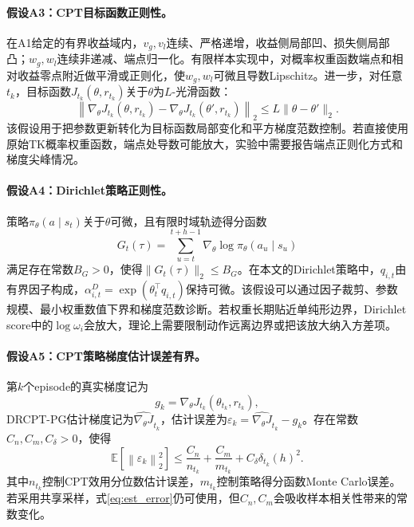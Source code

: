 \paragraph{假设A3：CPT目标函数正则性。}
在A1给定的有界收益域内，$v_g,v_l$连续、严格递增，收益侧局部凹、损失侧局部凸；$w_g,w_l$连续非递减、端点归一化。有限样本实现中，对概率权重函数端点和相对收益零点附近做平滑或正则化，使$w_g,w_l$可微且导数Lipschitz。进一步，对任意$t_k$，目标函数$J_{t_k}(\theta,r_{t_k})$关于$\theta$为$L$-光滑函数：
\begin{equation}
\label{eq:smooth}
\left\|
\nabla_\theta J_{t_k}(\theta,r_{t_k})
-
\nabla_\theta J_{t_k}(\theta',r_{t_k})
\right\|_2
\le
L\|\theta-\theta'\|_2.
\end{equation}
该假设用于把参数更新转化为目标函数局部变化和平方梯度范数控制。若直接使用原始TK概率权重函数，端点处导数可能放大，实验中需要报告端点正则化方式和梯度尖峰情况。

\paragraph{假设A4：Dirichlet策略正则性。}
策略$\pi_\theta(a\mid s_t)$关于$\theta$可微，且有限时域轨迹得分函数
\begin{equation}
\label{eq:score_def}
G_t(\tau)
=
\sum_{u=t}^{t+h-1}
\nabla_\theta \log \pi_\theta(a_u\mid s_u)
\end{equation}
满足存在常数$B_G>0$，使得$\|G_t(\tau)\|_2\le B_G$。在本文的Dirichlet策略中，$q_{i,t}$由有界因子构成，$\alpha^D_{i,t}=\exp(\theta_t^\top q_{i,t})$保持可微。该假设可以通过因子裁剪、参数规模、最小权重数值下界和梯度范数诊断。若权重长期贴近单纯形边界，Dirichlet score中的$\log\omega_i$会放大，理论上需要限制动作远离边界或把该放大纳入方差项。

\paragraph{假设A5：CPT策略梯度估计误差有界。}
第$k$个episode的真实梯度记为
\begin{equation*}
g_k
=
\nabla_\theta J_{t_k}(\theta_{t_k},r_{t_k}),
\end{equation*}
DRCPT-PG估计梯度记为$\widehat{\nabla_\theta J}_{t_k}$，估计误差为$\varepsilon_k=\widehat{\nabla_\theta J}_{t_k}-g_k$。存在常数$C_n,C_m,C_\delta>0$，使得
\begin{equation}
\label{eq:est_error}
\mathbb{E}
\left[
\left\|
\varepsilon_k
\right\|_2^2
\right]
\le
\frac{C_n}{n_{t_k}}
+
\frac{C_m}{m_{t_k}}
+
C_\delta \delta_{t_k}(h)^2.
\end{equation}
其中$n_{t_k}$控制CPT效用分位数估计误差，$m_{t_k}$控制策略得分函数Monte Carlo误差。若采用共享采样，式\eqref{eq:est_error}仍可使用，但$C_n,C_m$会吸收样本相关性带来的常数变化。

